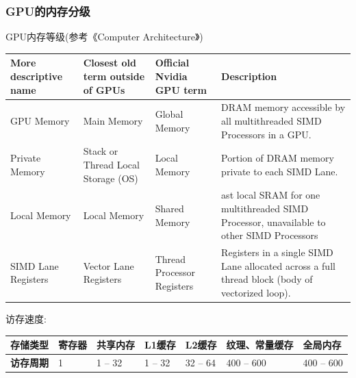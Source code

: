 \documentclass[UTF8]{ctexart}
\begin{document}
\subsubsection{GPU的内存分级}
GPU内存等级(参考《Computer Architecture》\cite{hennessy_computer_nodate})
\begin{center}
  \begin{tabular}{| m{8em} | m{8em} | m{10em} | m{12em} |}
    \hline
    \textbf{More descriptive name} & \textbf{Closest old term outside of GPUs} & \textbf{Official Nvidia GPU term} & \textbf{Description} \\ [0.5ex] 
    \hline
    GPU Memory & Main Memory & Global Memory & DRAM memory accessible by all multithreaded SIMD Processors in a GPU.\\
    \hline
    Private Memory & Stack or Thread Local Storage (OS) & Local Memory & Portion of DRAM memory private to each SIMD Lane.\\
    \hline
    Local Memory & Local Memory & Shared Memory & ast local SRAM for one multithreaded SIMD Processor, unavailable to other SIMD Processors\\
    \hline
    SIMD Lane Registers & Vector Lane Registers & Thread Processor Registers & Registers in a single SIMD Lane allocated across a full thread block (body of vectorized loop).\\
    \hline
  \end{tabular}
\end{center}

访存速度:
\begin{center}
  \begin{tabular}{| m{6em} | m{6em} | m{6em} | m{6em} | m{6em} | m{8em} | m{5em} |}
    \hline
    \textbf{存储类型} & \textbf{寄存器} & \textbf{共享内存} & \textbf{L1缓存} & \textbf{L2缓存} & \textbf{纹理、常量缓存} & \textbf{全局内存}\\
    \hline
    \textbf{访存周期} & 1 & 1 -- 32 &	1 -- 32	& 32 -- 64	& 400 -- 600	& 400 -- 600\\
    \hline
  \end{tabular}
\end{center}
\end{document}
